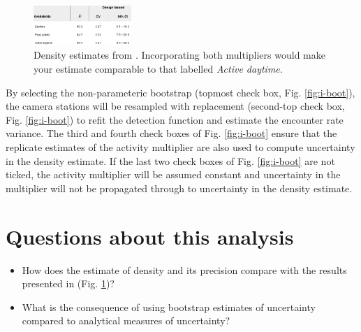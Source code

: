 \documentclass[a4paper, 10pt]{article}
\begin{document}
\begin{figure}
\includegraphics[width=0.33\textwidth]{images/density-table.png}
\caption{Density estimates from \citet{howeetal}.  Incorporating both multipliers would make your estimate comparable to that labelled \emph{Active daytime}. \label{fig:dentab}}
\vspace{-25pt}
\end{figure}
\vspace{.6in}

By selecting the non-parameteric bootstrap (topmost check box, Fig. \ref{fig:i-boot}), the camera stations will be resampled with replacement (second-top check box, Fig. \ref{fig:i-boot}) to refit the detection function and estimate the encounter rate variance.  The third and fourth check boxes of Fig. \ref{fig:i-boot} ensure that the replicate estimates of the activity multiplier are also used to compute uncertainty in the density estimate.  If the last two check boxes of Fig. \ref{fig:i-boot} are not ticked, the activity multiplier will be assumed constant and uncertainty in the multiplier will not be propagated through to uncertainty in the density estimate.

\section{Questions about this analysis}


\begin{itemize}
	\item How does the estimate of density and its precision compare with the results presented in \citet{howeetal} (Fig. \ref{fig:dentab})?
{
}
	\item What is the consequence of using bootstrap estimates of uncertainty compared to analytical measures of uncertainty?
{
}
\end{itemize}

\printbibliography
\end{document}
